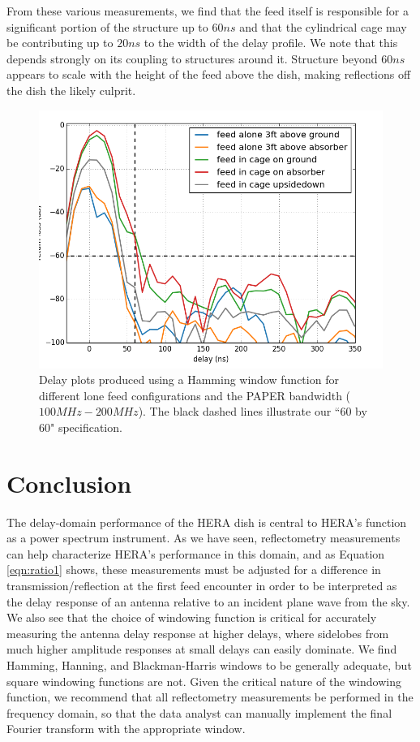 \documentclass[12pt,preprint]{aastex}
\begin{document}
From these various measurements, we find that the feed itself is responsible for a significant portion of the structure up to $60ns$ and
that the cylindrical cage may be contributing up to $20ns$ to the width of the delay profile. We note that this depends strongly
on its coupling to structures around it. Structure beyond $60ns$ appears to scale
with the height of the feed above the dish, making reflections off the dish the likely culprit.

\begin{figure}[H]
\centering
\includegraphics[totalheight=0.4\textheight]{plots/delay_feed.png}
\caption{Delay plots produced using a Hamming window function for different lone feed configurations and the PAPER bandwidth ($100MHz-200MHz$). The black dashed lines illustrate our ``60 by 60" specification.}
\label{fig:outofthedish}
\end{figure}

\section{Conclusion}

The delay-domain performance of the HERA dish is central to HERA's function as a power spectrum instrument.
As we have seen, reflectometry measurements can help characterize HERA's performance in this domain, and
as Equation \ref{eqn:ratio1} shows, these measurements must be adjusted for a difference in transmission/reflection
at the first feed encounter in order to be interpreted as the delay response of an antenna relative to an incident
plane wave from the sky.  We also see that the choice of windowing function is critical for accurately measuring the
antenna delay response at higher delays, where sidelobes from much higher amplitude responses at small delays can easily
dominate.  We find Hamming, Hanning, and Blackman-Harris windows to be generally adequate, but square windowing functions are not.
Given the critical nature of the windowing function, we recommend that all reflectometry measurements be performed in the
frequency domain, so that the data analyst can manually implement the final Fourier transform with the appropriate window.
\end{document}
